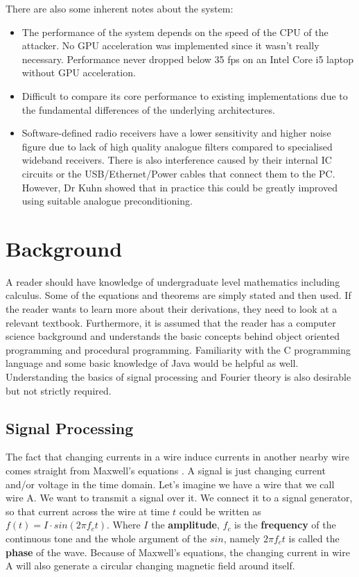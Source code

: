 \documentclass[a4paper,12pt,twoside,openright]{report}
\begin{document}
There are also some inherent notes about the system:
\begin{itemize}

  \item The performance of the system depends on the speed of the CPU of the attacker. No GPU acceleration was implemented since it wasn't really necessary. Performance never dropped below 35 fps on an Intel Core i5 laptop without GPU acceleration.
  \item Difficult to compare its core performance to existing implementations due to the fundamental differences of the underlying architectures.
  \item Software-defined radio receivers have a lower sensitivity and higher noise figure due to lack of high quality analogue filters compared to specialised wideband receivers. There is also interference caused by their internal IC circuits or the USB/Ethernet/Power cables that connect them to the PC. However, Dr Kuhn showed that in practice this could be greatly improved using suitable analogue preconditioning.
  
\end{itemize}

\chapter{Background}

A reader should have knowledge of undergraduate level mathematics including calculus. Some of the equations and theorems are simply stated and then used. If the reader wants to learn more about their derivations, they need to look at a relevant textbook. Furthermore, it is assumed that the reader has a computer science background and understands the basic concepts behind object oriented programming and procedural programming. Familiarity with the C programming language and some basic knowledge of Java would be helpful as well. Understanding the basics of signal processing and Fourier theory is also desirable but not strictly required.

\section{Signal Processing} 

The fact that changing currents in a wire induce currents in another nearby wire comes straight from Maxwell's equations \cite{maxwell1881treatise}. A signal is just changing current and/or voltage in the time domain. Let's imagine we have a wire that we call wire A. We want to transmit a signal over it. We connect it to a signal generator, so that current across the wire at time $t$ could be written as $f(t) = I \cdot sin(2\pi f_{c} t)$. Where $I$ the \textbf{amplitude}, $f_{c}$ is the \textbf{frequency} of the continuous tone and the whole argument of the $sin$, namely $2\pi f_{c} t$ is called the \textbf{phase} of the wave. Because of Maxwell's equations, the changing current in wire A will also generate a circular changing magnetic field around itself.
\end{document}
